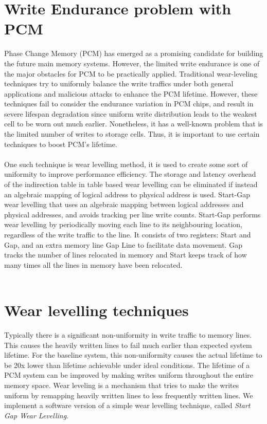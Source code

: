 \documentclass[11pt, conference, onecolumn]{IEEEtran}
\begin{document}
\section{Write Endurance problem with PCM}
 Phase Change Memory (PCM) has emerged as a promising candidate for building the future main memory systems. However, the limited write endurance is one of the major obstacles for PCM to be practically applied. Traditional wear-leveling techniques try to uniformly balance the write traffics under both general applications and malicious attacks to enhance the PCM lifetime. However, these techniques fail to consider the endurance variation in PCM chips, and result in severe lifespan degradation since uniform write distribution leads to the weakest cell to be worn out much earlier. Nonetheless, it has a well-known problem that is the limited number of writes to storage cells. Thus, it is important to use certain techniques to boost PCM's lifetime. \\
\\One such technique is wear levelling method, it is used to create some sort of uniformity to improve performance efficiency. The storage and latency overhead of the indirection table in table based wear levelling can be eliminated if instead an algebraic mapping of logical address to physical address is used. Start-Gap wear levelling that uses an algebraic mapping between logical addresses and physical addresses, and avoids tracking per line write counts. Start-Gap performs wear levelling by periodically moving each line to its neighbouring location, regardless of the write traffic to the line. It consists of two registers: Start and Gap, and an extra memory line Gap Line to facilitate data movement. Gap tracks the number of lines relocated in memory and Start keeps track of how many times all the lines in memory have been relocated.
\\
\\
\section{Wear levelling techniques}
Typically there is a significant non-uniformity in write traffic to memory lines. This causes the heavily written lines to fail much earlier than expected system lifetime. For the baseline system, this non-uniformity causes the actual lifetime to be 20x lower than lifetime achievable under ideal conditions. The lifetime of a PCM system can be improved by making writes uniform throughout the entire memory space. Wear leveling is a mechanism that tries to make the writes uniform by remapping heavily written lines to less frequently written lines. We implement a software version of a simple wear levelling technique, called \textit{Start Gap Wear Levelling}\cite{b3}.
\\
\\
\end{document}
